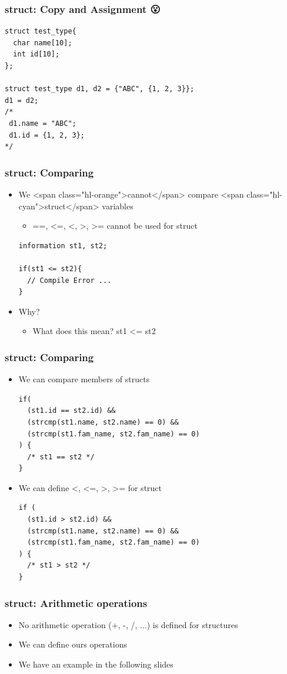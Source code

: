 \documentclass{../c-lecture}
\begin{document}
\begin{frame}[fragile]
  \frametitle{struct: Copy and Assignment 😮}
  \begin{verbatim}
struct test_type{
  char name[10];
  int id[10];
};

struct test_type d1, d2 = {"ABC", {1, 2, 3}};
d1 = d2;
/*
 d1.name = "ABC";
 d1.id = {1, 2, 3};
*/

  \end{verbatim}
\end{frame}

\begin{frame}[fragile]
  \frametitle{struct: Comparing}
  \begin{itemize}
    \item
      We <span class="hl-orange">cannot</span> compare
      <span class="hl-cyan">struct</span> variables

    \begin{itemize}
      \item ==, <=, <, >, >= cannot be used for struct
    \end{itemize}
    \begin{verbatim}
information st1, st2;

if(st1 <= st2){
  // Compile Error ...
}

    \end{verbatim}
    \item Why?
    \begin{itemize}
      \item What does this mean? st1 <= st2
    \end{itemize}
  \end{itemize}
\end{frame}

\begin{frame}[fragile]
  \frametitle{struct: Comparing}
  \begin{itemize}
    \item We can compare members of structs
    \begin{verbatim}
if(
  (st1.id == st2.id) &&
  (strcmp(st1.name, st2.name) == 0) &&
  (strcmp(st1.fam_name, st2.fam_name) == 0)
) {
  /* st1 == st2 */
}
    \end{verbatim}
    \item We can define <, <=, >, >= for struct
    \begin{verbatim}
if (
  (st1.id > st2.id) &&
  (strcmp(st1.name, st2.name) == 0) &&
  (strcmp(st1.fam_name, st2.fam_name) == 0)
) {
  /* st1 > st2 */
}
    \end{verbatim}
  \end{itemize}
\end{frame}
\begin{frame}
  \frametitle{struct: Arithmetic operations}
  \begin{itemize}
    \item No arithmetic operation (+, -, /, ...) is defined for structures
    \item We can define ours operations
    \item We have an example in the following slides
  \end{itemize}
\end{frame}
\end{document}
